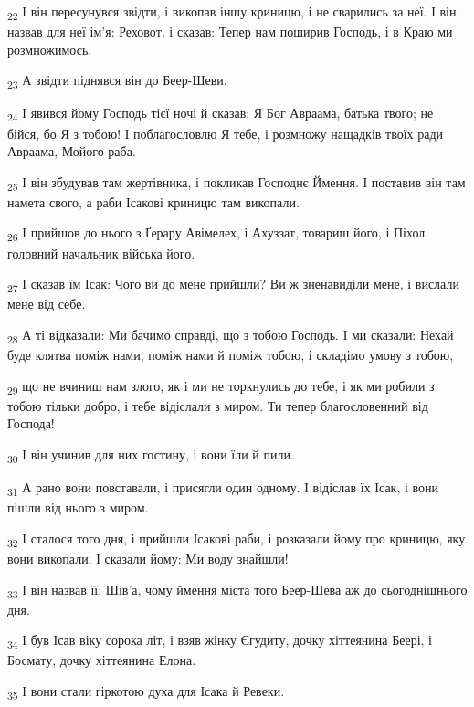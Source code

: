 \begin{tcolorbox}
\textsubscript{22} І він пересунувся звідти, і викопав іншу криницю, і не сварились за неї. І він назвав для неї ім'я: Реховот, і сказав: Тепер нам поширив Господь, і в Краю ми розмножимось.
\end{tcolorbox}
\begin{tcolorbox}
\textsubscript{23} А звідти піднявся він до Беер-Шеви.
\end{tcolorbox}
\begin{tcolorbox}
\textsubscript{24} І явився йому Господь тієї ночі й сказав: Я Бог Авраама, батька твого; не бійся, бо Я з тобою! І поблагословлю Я тебе, і розмножу нащадків твоїх ради Авраама, Мойого раба.
\end{tcolorbox}
\begin{tcolorbox}
\textsubscript{25} І він збудував там жертівника, і покликав Господнє Ймення. І поставив він там намета свого, а раби Ісакові криницю там викопали.
\end{tcolorbox}
\begin{tcolorbox}
\textsubscript{26} І прийшов до нього з Ґерару Авімелех, і Ахуззат, товариш його, і Піхол, головний начальник війська його.
\end{tcolorbox}
\begin{tcolorbox}
\textsubscript{27} І сказав їм Ісак: Чого ви до мене прийшли? Ви ж зненавиділи мене, і вислали мене від себе.
\end{tcolorbox}
\begin{tcolorbox}
\textsubscript{28} А ті відказали: Ми бачимо справді, що з тобою Господь. І ми сказали: Нехай буде клятва поміж нами, поміж нами й поміж тобою, і складімо умову з тобою,
\end{tcolorbox}
\begin{tcolorbox}
\textsubscript{29} що не вчиниш нам злого, як і ми не торкнулись до тебе, і як ми робили з тобою тільки добро, і тебе відіслали з миром. Ти тепер благословенний від Господа!
\end{tcolorbox}
\begin{tcolorbox}
\textsubscript{30} І він учинив для них гостину, і вони їли й пили.
\end{tcolorbox}
\begin{tcolorbox}
\textsubscript{31} А рано вони повставали, і присягли один одному. І відіслав їх Ісак, і вони пішли від нього з миром.
\end{tcolorbox}
\begin{tcolorbox}
\textsubscript{32} І сталося того дня, і прийшли Ісакові раби, і розказали йому про криницю, яку вони викопали. І сказали йому: Ми воду знайшли!
\end{tcolorbox}
\begin{tcolorbox}
\textsubscript{33} І він назвав її: Шів'а, чому ймення міста того Беер-Шева аж до сьогоднішнього дня.
\end{tcolorbox}
\begin{tcolorbox}
\textsubscript{34} І був Ісав віку сорока літ, і взяв жінку Єгудиту, дочку хіттеянина Беері, і Босмату, дочку хіттеянина Елона.
\end{tcolorbox}
\begin{tcolorbox}
\textsubscript{35} І вони стали гіркотою духа для Ісака й Ревеки.
\end{tcolorbox}
